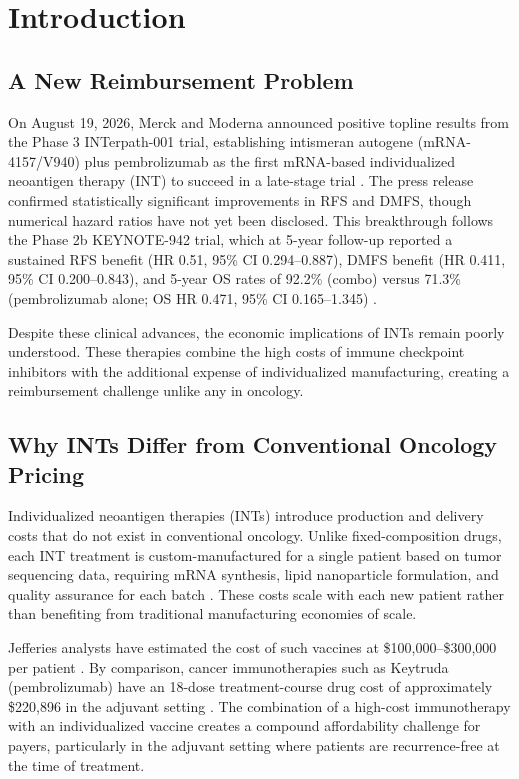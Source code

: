 \documentclass[12pt,a4paper]{article}
\begin{document}
\endgroup

\newpage

\doublespacing

\section{Introduction}

\subsection{A New Reimbursement Problem}

On August 19, 2026, Merck and Moderna announced positive topline results from the Phase 3 \mbox{INTerpath-001} trial, establishing intismeran autogene (mRNA-4157/V940) plus \mbox{pembrolizumab} as the first mRNA-based individualized neoantigen therapy (INT) to succeed in a late-stage trial \cite{merck2026}. The press release confirmed statistically significant improvements in RFS and DMFS, though numerical hazard ratios have not yet been disclosed. This breakthrough follows the Phase 2b \mbox{KEYNOTE-942} trial, which at 5-year follow-up reported a sustained RFS benefit (HR 0.51, 95\% CI 0.294--0.887), DMFS benefit (HR 0.411, 95\% CI 0.200--0.843), and 5-year OS rates of 92.2\% (combo) versus 71.3\% (\mbox{pembrolizumab} alone; OS HR 0.471, 95\% CI 0.165--1.345) \cite{khattak2026}.

Despite these clinical advances, the economic implications of INTs remain poorly understood. These therapies combine the high costs of immune checkpoint inhibitors with the additional expense of individualized manufacturing, creating a reimbursement challenge unlike any in oncology.

\subsection{Why INTs Differ from Conventional Oncology Pricing}

Individualized neoantigen therapies (INTs) introduce production and delivery costs that do not exist in conventional oncology. Unlike fixed-composition drugs, each INT treatment is custom-manufactured for a single patient based on tumor sequencing data, requiring mRNA synthesis, lipid nanoparticle formulation, and quality assurance for each batch \cite{ibragimova2025, li2026}. These costs scale with each new patient rather than benefiting from traditional manufacturing economies of scale.

Jefferies analysts have estimated the cost of such vaccines at \$100,000--\$300,000 per patient \cite{jefferies2026}. By comparison, cancer immunotherapies such as Keytruda\textregistered{} (\mbox{pembrolizumab}) have an 18-dose treatment-course drug cost of approximately \$220,896 in the adjuvant setting \cite{keytruda2026}. The combination of a high-cost immunotherapy with an individualized vaccine creates a compound affordability challenge for payers, particularly in the adjuvant setting where patients are recurrence-free at the time of treatment.
\end{document}
